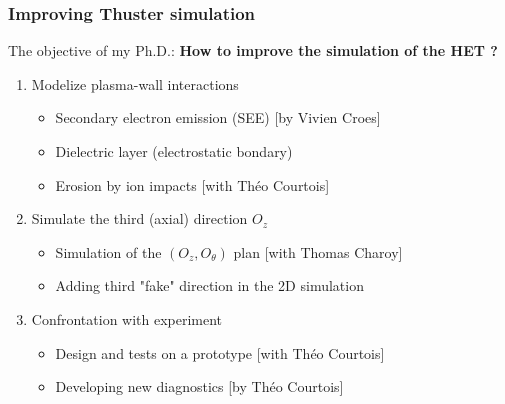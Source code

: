 \documentclass[sans, aspectratio=169]{beamer}
\begin{document}
\begin{frame} 
\frametitle{Improving Thuster simulation} 

The objective of my Ph.D.:\textbf{ How to improve the simulation of the HET ? }
\begin{enumerate}

	\item Modelize plasma-wall interactions
	\begin{itemize}
		\item<2-> Secondary electron emission (SEE) [by Vivien Croes]
		\item<2- | alert@3> Dielectric layer (electrostatic bondary)
		\item<2- | alert@3> Erosion by ion impacts [with Théo Courtois]
	\end{itemize}
	\item Simulate the third (axial) direction $O_z$
	\begin{itemize}
		\item<2- | alert@3> Simulation of the $(O_z, O_{\theta})$ plan [with Thomas Charoy]
		\item<2- | alert@3> Adding third "fake" direction in the 2D simulation
	\end{itemize}
	\item Confrontation with experiment
	\begin{itemize}
		\item<2- | alert@3> Design and tests on a prototype  [with Théo Courtois]
		\item<2- > Developing new diagnostics  [by Théo Courtois]
	\end{itemize}
\end{enumerate}
\end{frame}
\end{document}
